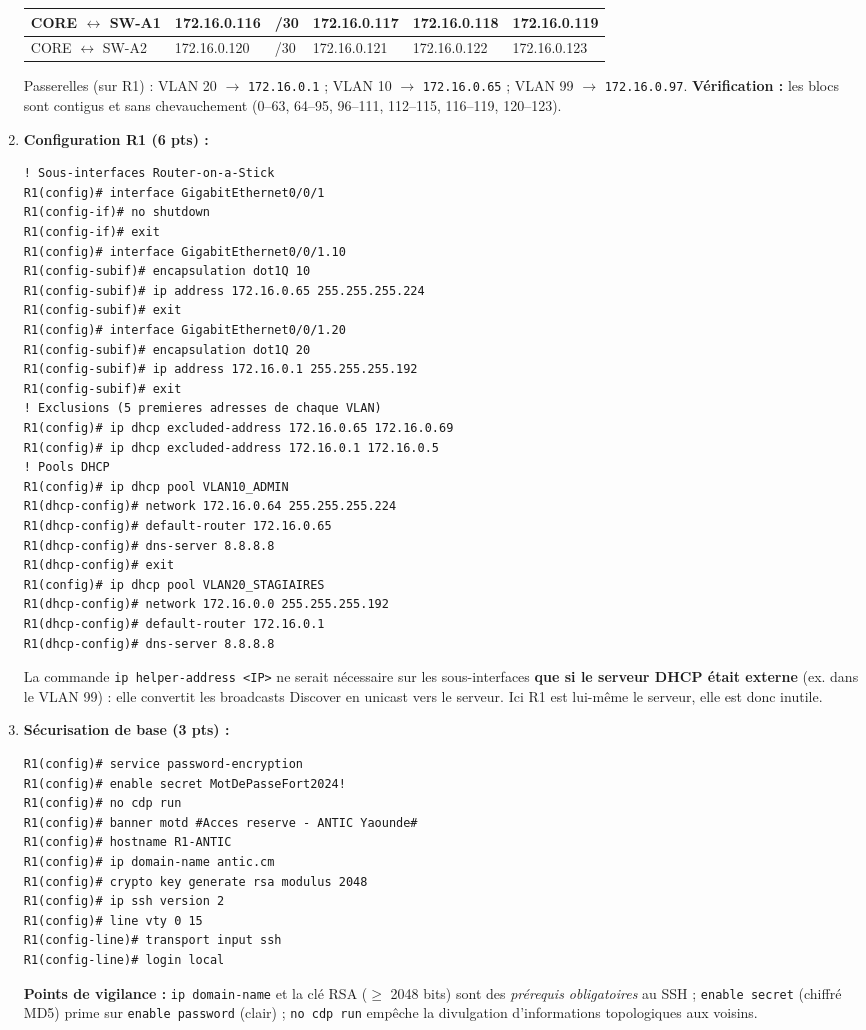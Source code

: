 \documentclass[11pt]{article}
\begin{document}
\begin{corrige}
\begin{enumerate}
\begin{center}
\begin{tabular}{|l|l|l|l|l|l|}
    CORE $\leftrightarrow$ SW-A1 & 172.16.0.116 & /30 & 172.16.0.117 & 172.16.0.118 & 172.16.0.119 \\ \hline
    CORE $\leftrightarrow$ SW-A2 & 172.16.0.120 & /30 & 172.16.0.121 & 172.16.0.122 & 172.16.0.123 \\ \hline
    \end{tabular}
    \end{center}
    Passerelles (sur R1) : VLAN 20 $\to$ \texttt{172.16.0.1} ; VLAN 10 $\to$ \texttt{172.16.0.65} ; VLAN 99 $\to$ \texttt{172.16.0.97}. \textbf{Vérification :} les blocs sont contigus et sans chevauchement (0--63, 64--95, 96--111, 112--115, 116--119, 120--123).
    \item \textbf{Configuration R1 (6 pts) :}
\begin{lstlisting}
! Sous-interfaces Router-on-a-Stick
R1(config)# interface GigabitEthernet0/0/1
R1(config-if)# no shutdown
R1(config-if)# exit
R1(config)# interface GigabitEthernet0/0/1.10
R1(config-subif)# encapsulation dot1Q 10
R1(config-subif)# ip address 172.16.0.65 255.255.255.224
R1(config-subif)# exit
R1(config)# interface GigabitEthernet0/0/1.20
R1(config-subif)# encapsulation dot1Q 20
R1(config-subif)# ip address 172.16.0.1 255.255.255.192
R1(config-subif)# exit
! Exclusions (5 premieres adresses de chaque VLAN)
R1(config)# ip dhcp excluded-address 172.16.0.65 172.16.0.69
R1(config)# ip dhcp excluded-address 172.16.0.1 172.16.0.5
! Pools DHCP
R1(config)# ip dhcp pool VLAN10_ADMIN
R1(dhcp-config)# network 172.16.0.64 255.255.255.224
R1(dhcp-config)# default-router 172.16.0.65
R1(dhcp-config)# dns-server 8.8.8.8
R1(dhcp-config)# exit
R1(config)# ip dhcp pool VLAN20_STAGIAIRES
R1(dhcp-config)# network 172.16.0.0 255.255.255.192
R1(dhcp-config)# default-router 172.16.0.1
R1(dhcp-config)# dns-server 8.8.8.8
\end{lstlisting}
    La commande \texttt{ip helper-address <IP>} ne serait nécessaire sur les sous-interfaces \textbf{que si le serveur DHCP était externe} (ex. dans le VLAN 99) : elle convertit les broadcasts Discover en unicast vers le serveur. Ici R1 est lui-même le serveur, elle est donc inutile.
    \item \textbf{Sécurisation de base (3 pts) :}
\begin{lstlisting}
R1(config)# service password-encryption
R1(config)# enable secret MotDePasseFort2024!
R1(config)# no cdp run
R1(config)# banner motd #Acces reserve - ANTIC Yaounde#
R1(config)# hostname R1-ANTIC
R1(config)# ip domain-name antic.cm
R1(config)# crypto key generate rsa modulus 2048
R1(config)# ip ssh version 2
R1(config)# line vty 0 15
R1(config-line)# transport input ssh
R1(config-line)# login local
\end{lstlisting}
    \textbf{Points de vigilance :} \texttt{ip domain-name} et la clé RSA ($\ge$ 2048 bits) sont des \emph{prérequis obligatoires} au SSH ; \texttt{enable secret} (chiffré MD5) prime sur \texttt{enable password} (clair) ; \texttt{no cdp run} empêche la divulgation d'informations topologiques aux voisins.
\end{enumerate}
\end{corrige}
\end{document}
